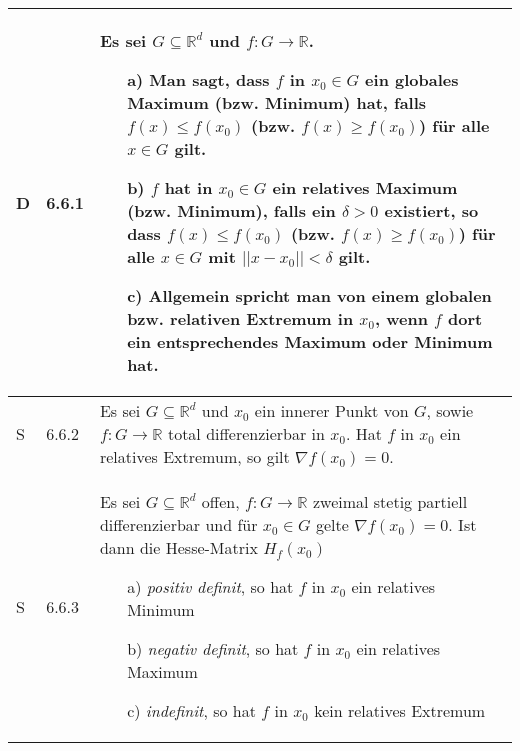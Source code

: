     \begin{longtable}{p{0.75cm} p{1cm} p{16cm}}
        \toprule

        D   & 6.6.1 &   Es sei $G \subseteq \mathbb{R}^d$ und $f: G \rightarrow \mathbb{R}$.
                        \begin{itemize}[topsep=-0.5cm]
                            \item[a)] Man sagt, dass $f$ in $x_0 \in G$ ein globales Maximum (bzw. Minimum) hat, falls  $f(x) \leq f(x_0)$
                                        (bzw. $f(x) \geq f(x_0)$) für alle $x \in G$ gilt.
                            \item[b)] $f$ hat in $x_0 \in G$ ein relatives Maximum (bzw. Minimum), falls ein $\delta > 0$ existiert, so dass
                                        $f(x) \leq f(x_0)$ (bzw. $f(x) \geq f(x_0)$) für alle $x \in G$ mit $||x-x_0|| < \delta$ gilt.
                            \item[c)] Allgemein spricht man von einem globalen bzw. relativen Extremum in $x_0$, wenn $f$ dort ein entsprechendes
                                        Maximum oder Minimum hat.  
                        \end{itemize} \vspace{-0cm} \\ 
        \midrule
        S   & 6.6.2 &   Es sei $G \subseteq \mathbb{R}^d$ und $x_0$ ein innerer Punkt von $G$, sowie $f: G \rightarrow \mathbb{R}$ total
                        differenzierbar in $x_0$. Hat $f$ in $x_0$ ein relatives Extremum, so gilt $\nabla f(x_0) = 0$. \\
        \midrule
        S   & 6.6.3 &   Es sei $G \subseteq \mathbb{R}^d$ offen, $f: G \rightarrow \mathbb{R}$ zweimal stetig partiell differenzierbar und für
                        $x_0 \in G$ gelte $\nabla f(x_0) = 0$. Ist dann die Hesse-Matrix $H_f(x_0)$ 
                        \begin{itemize}[topsep=-0.5cm]
                            \item[a)] \textit{positiv definit}, so hat $f$ in $x_0$ ein relatives Minimum
                            \item[b)] \textit{negativ definit}, so hat $f$ in $x_0$ ein relatives Maximum
                            \item[c)] \textit{indefinit}, so hat $f$ in $x_0$ kein relatives Extremum
                        \end{itemize} \vspace{-0cm} \\
        \bottomrule

    \end{longtable}

